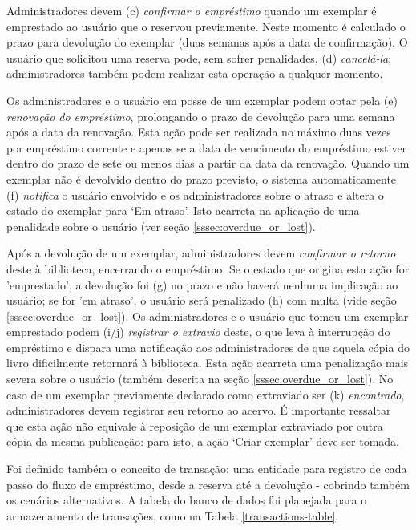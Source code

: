 \documentclass[a4paper]{article}
\begin{document}
Administradores devem (c) \textit{confirmar o empréstimo} quando um exemplar é emprestado ao usuário que o reservou previamente. Neste momento é calculado o prazo para devolução do exemplar (duas semanas após a data de confirmação). O usuário que solicitou uma reserva pode, sem sofrer penalidades, (d) \textit{cancelá-la}; administradores também podem realizar esta operação a qualquer momento.

Os administradores e o usuário em posse de um exemplar podem optar pela (e) \textit{renovação do empréstimo}, prolongando o prazo de devolução para uma semana após a data da renovação. Esta ação pode ser realizada no máximo duas vezes por empréstimo corrente e apenas se a data de vencimento do empréstimo estiver dentro do prazo de sete ou menos dias a partir da data da renovação. Quando um exemplar não é devolvido dentro do prazo previsto, o sistema automaticamente (f) \textit{notifica} o usuário envolvido e os administradores sobre o atraso e altera o estado do exemplar para ‘Em atraso’. Isto acarreta na aplicação de uma penalidade sobre o usuário (ver seção \ref{sssec:overdue_or_lost}).

Após a devolução de um exemplar, administradores devem \textit{confirmar o retorno} deste à biblioteca, encerrando o empréstimo. Se o estado que origina esta ação for 'emprestado', a devolução foi (g) no prazo e não haverá nenhuma implicação ao usuário; se for 'em atraso', o usuário será penalizado (h) com multa (vide seção \ref{sssec:overdue_or_lost}). Os administradores e o usuário que tomou um exemplar emprestado podem (i/j) \textit{registrar o extravio} deste, o que leva à interrupção do empréstimo e dispara uma notificação aos administradores de que aquela cópia do livro dificilmente retornará à biblioteca. Esta ação acarreta uma penalização mais severa sobre o usuário (também descrita na seção \ref{sssec:overdue_or_lost}). No caso de um exemplar previamente declarado como extraviado ser (k) \textit{encontrado}, administradores devem registrar seu retorno ao acervo. É importante ressaltar que esta ação não equivale à reposição de um exemplar extraviado por outra cópia da mesma publicação: para isto, a ação ‘Criar exemplar’ deve ser tomada.

Foi definido também o conceito de transação: uma entidade para registro de cada passo do fluxo de empréstimo, desde a reserva até a devolução - cobrindo também os cenários alternativos. A tabela do banco de dados foi planejada para o armazenamento de transações, como na Tabela \ref{transactions-table}.
\end{document}

